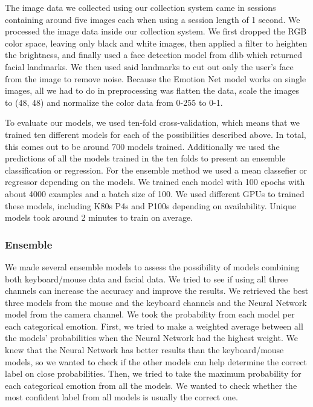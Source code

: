     The image data we collected using our collection system came in sessions containing around five images each when using a session length of 1 second. 
    We processed the image data inside our collection system. We first dropped the RGB color space, leaving only black and white images, 
    then applied a filter to heighten the brightness, and finally used a face detection model from dlib \cite{dlib} which returned facial landmarks. 
    We then used said landmarks to cut out only the user's face from the image to remove noise. Because the Emotion Net model works on single images, 
    all we had to do in preprocessing was flatten the data, scale the images to (48, 48) and normalize the color data from 0-255 to 0-1.

    To evaluate our models, we used ten-fold cross-validation, which means that we trained ten different models for each of 
    the possibilities described above. In total, this comes out to be around 700 models trained. Additionally we used the predictions
    of all the models trained in the ten folds to present an ensemble classification or regression. For the ensemble method we used a 
    mean classefier or regressor depending on the models. 
    We trained each model with 100 epochs with about 4000 examples and a batch size of 100. We used different GPUs to trained these models, 
    including K80s P4s and P100s depending on availability. Unique models took around 2 minutes to train on average.

    \subsubsection{Ensemble} \label{section:methodology_ensemble}
    We made several ensemble models to assess the possibility of models combining both keyboard/mouse data and facial data. 
    We tried to see if using all three channels can increase the accuracy and improve the results. We retrieved the best three models from the 
    mouse and the keyboard channels and the Neural Network model from the camera channel. We took the probability from each model per each categorical emotion. 
    First, we tried to make a weighted average between all the models' probabilities when the Neural Network had the highest weight. 
    We knew that the Neural Network has better results than the keyboard/mouse models,
    so we wanted to check if the other models can help determine the correct label on close probabilities. 
    Then, we tried to take the maximum probability for each categorical emotion from all the models. We wanted to check whether the 
    most confident label from all models is usually the correct one.
